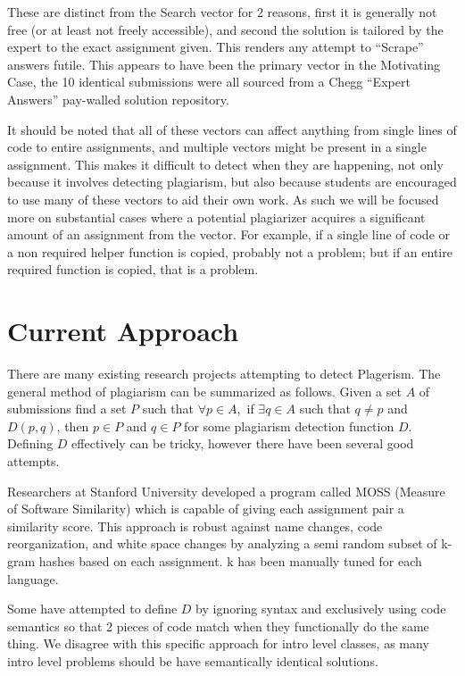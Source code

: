 \documentclass[letterpaper,10pt,conference]{IEEEtran}
\begin{document}
\begin{itemize}
\begin{itemize}
	
	\end{itemize} These are distinct from the Search vector for 2 reasons, first it is generally not free (or at least not freely accessible), and second the solution is tailored by the expert to the exact assignment given.  This renders any attempt to ``Scrape'' answers futile.
	This appears to have been the primary vector in the Motivating Case, the 10 identical submissions were all sourced from a Chegg ``Expert Answers'' pay-walled solution repository.
\end{itemize}
 It should be noted that all of these vectors can affect anything from single lines of code to entire assignments, and multiple vectors might be present in a single assignment.
	This makes it difficult to detect when they are happening, not only because it involves detecting plagiarism, but also because students are encouraged to use many of these vectors to aid their own work.  As such we will be focused more on substantial cases where a potential plagiarizer acquires a significant amount of an assignment from the vector.  For example, if a single line of code or a non required helper function is copied, probably not a problem; but if an entire required function is copied, that is a problem.
\section{Current Approach}
There are many existing research projects attempting to detect Plagerism.  The general method of plagiarism can be summarized as follows.  Given a set $A$ of submissions find a set $P$ such that  $\forall p\in A,$ if $\exists q\in A$ such that $q\not=p$ and $D(p,q)$, then $p\in P$ and $q\in P$ for some plagiarism detection function $D$.  Defining $D$ effectively can be tricky\cite{attitude}, however there have been several good attempts.
	
		Researchers at Stanford University developed a program called MOSS (Measure of Software Similarity) which is capable of giving each assignment pair a similarity score. This approach is robust against name changes, code reorganization, and white space changes by analyzing a semi random subset of k-gram hashes based on each assignment.  k has been manually tuned for each language\cite{moss}.
	
	Some have attempted to define $D$ by ignoring syntax and exclusively using code semantics\cite{semantic} so that 2 pieces of code match when they functionally do the same thing.  We disagree with this specific approach for intro level classes, as many intro level problems should be have semantically identical solutions. 
	
\end{document}
